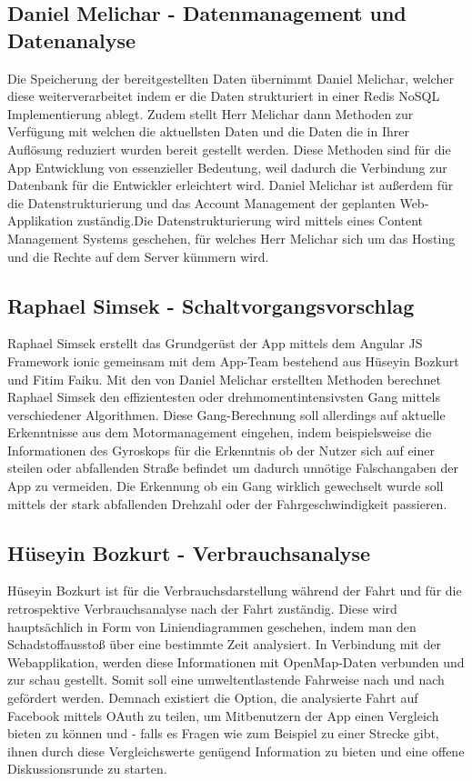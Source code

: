 	\subsection{Daniel Melichar - Datenmanagement und Datenanalyse}
	Die Speicherung der bereitgestellten Daten übernimmt Daniel Melichar, welcher diese weiterverarbeitet indem er die Daten strukturiert in einer Redis NoSQL Implementierung ablegt. Zudem stellt Herr Melichar dann Methoden zur Verfügung mit welchen die aktuellsten Daten und die Daten die in Ihrer Auflösung reduziert wurden bereit gestellt werden. Diese Methoden sind für die App Entwicklung von essenzieller Bedeutung, weil dadurch die Verbindung zur Datenbank für die Entwickler erleichtert wird.
	Daniel Melichar ist außerdem für die Datenstrukturierung und das Account Management der geplanten Web-Applikation zuständig.Die Datenstrukturierung wird mittels eines Content Management Systems geschehen, für welches Herr Melichar sich um das Hosting und die Rechte auf dem Server kümmern wird. 

	\subsection{Raphael Simsek - Schaltvorgangsvorschlag}
	Raphael Simsek erstellt das Grundgerüst der App mittels dem Angular JS Framework ionic gemeinsam mit dem App-Team bestehend aus Hüseyin Bozkurt und Fitim Faiku.
	Mit den von Daniel Melichar erstellten Methoden berechnet Raphael Simsek den effizientesten oder drehmomentintensivsten Gang mittels verschiedener Algorithmen. Diese Gang-Berechnung soll allerdings auf aktuelle Erkenntnisse aus dem Motormanagement eingehen, indem beispielsweise die Informationen des Gyroskops für die Erkenntnis ob der Nutzer sich auf einer steilen oder abfallenden Straße befindet um dadurch unnötige Falschangaben der App zu vermeiden. Die Erkennung ob ein Gang wirklich gewechselt wurde soll mittels der stark abfallenden Drehzahl oder der Fahrgeschwindigkeit passieren.
	
	\subsection{Hüseyin Bozkurt - Verbrauchsanalyse}
	 Hüseyin Bozkurt ist für die Verbrauchsdarstellung während der Fahrt und für die retrospektive Verbrauchsanalyse nach der Fahrt zuständig.
	 Diese wird hauptsächlich in Form von Liniendiagrammen geschehen, indem man den Schadstoffausstoß über eine bestimmte Zeit analysiert. In Verbindung mit der Webapplikation, werden diese Informationen mit OpenMap-Daten verbunden und zur schau gestellt.
	 Somit soll eine umweltentlastende Fahrweise nach und nach gefördert werden. Demnach existiert die Option, die analysierte Fahrt auf Facebook mittels OAuth zu teilen, um Mitbenutzern der App einen Vergleich bieten zu können und - falls es Fragen wie zum Beispiel zu einer Strecke gibt, ihnen durch diese Vergleichswerte genügend Information zu bieten und eine offene Diskussionsrunde zu starten.
	

